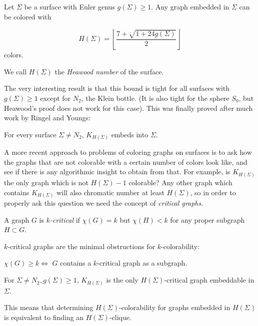 \begin{theorem}[Heawood]
Let $\Sigma$ be a surface with Euler genus $g(\Sigma) \geq 1$. Any graph embedded in $\Sigma$ can be colored with

$$
H(\Sigma) = \left\lfloor \frac{7 + \sqrt{1+24g(\Sigma)}}{2} \right\rfloor
$$
colors.
\end{theorem}

We call $H(\Sigma)$ the \emph{Heawood number} of the surface.

The very interesting result is that this bound is tight for all surfaces with $g(\Sigma) \geq 1$
except for $N_2$, the Klein bottle. (It is also tight for the sphere $S_0$, but Heawood's proof
does not work for this case). This was finally proved after much work by Ringel and Youngs:

\begin{theorem}
For every surface $\Sigma \neq N_2$, $K_{H(\Sigma)}$ embeds into $\Sigma$.
\end{theorem}

A more recent approach to problems of coloring graphs on surfaces is to ask how the graphs
that are not colorable with a certain number of colors look like, and see if there is any 
algorithmic insight to obtain from that.
For example, is $K_{H(\Sigma)}$ the only graph which is not $H(\Sigma)-1$ colorable?
Any other graph which contains $K_{H(\Sigma)}$ will also chromatic number at least $H(\Sigma)$,
so in order to properly ask this question we need the concept of \emph{critical graphs}.

\begin{definition}
A graph $G$ is \emph{$k$-critical} if $\chi(G) = k$ but $\chi(H) < k$ for any proper subgraph
$H \subset G$. 
\end{definition}

$k$-critical graphs are the minimal obstructions for $k$-colorability:

\begin{observation}
$\chi(G) \geq k \iff$ $G$ contains a $k$-critical graph as a subgraph.
\end{observation}

\begin{theorem}
For $\Sigma \neq N_2, g(\Sigma) \geq 1$, $K_{H(\Sigma)}$ is the only $H(\Sigma)$-critical graph
embeddable in $\Sigma$.
\end{theorem}

This means that determining $H(\Sigma)$-colorability for graphs embedded in $H(\Sigma)$ is 
equivalent to finding an $H(\Sigma)$-clique. 

